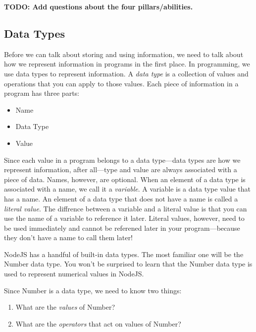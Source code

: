 \textbf{TODO: Add questions about the four pillars/abilities.}

\subsection{Data Types}
Before we can talk about storing and using information, we need to talk about how we represent information in programs in the first place. In programming, we use data types to represent information. A \emph{data type} is a collection of values and operations that you can apply to those values. Each piece of information in a program has three parts:

\begin{itemize}
  \item Name
  \item Data Type
  \item Value
\end{itemize}

Since each value in a program belongs to a data type---data types are how we represent information, after all---type and value are always associated with a piece of data. Names, however, are optional. When an element of a data type is associated with a name, we call it a \emph{variable}. A variable is a data type value that has a name. An element of a data type that does not have a name is called a \emph{literal value}. The diffrence between a variable and a literal value is that you can use the name of a variable to reference it later. Literal values, however, need to be used immediately and cannot be referened later in your program---because they don't have a name to call them later!

NodeJS has a handful of built-in data types. The most familiar one will be the \textsf{Number} data type. You won't be surprised to learn that the \textsf{Number} data type is used to represent numerical values in NodeJS.

Since \textsf{Number} is a data type, we need to know two things:
\begin{enumerate}
  \item What are the \emph{values} of \textsf{Number}?
  \item What are the \emph{operators} that act on values of \textsf{Number}?
\end{enumerate}

